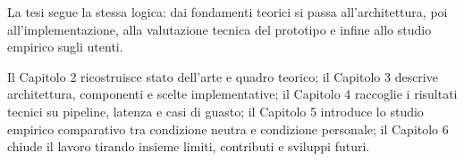 La tesi segue la stessa logica: dai fondamenti teorici si passa all'architettura, poi all'implementazione, alla valutazione tecnica del prototipo e infine allo studio empirico sugli utenti.

Il Capitolo 2 ricostruisce stato dell'arte e quadro teorico; il Capitolo 3 descrive architettura, componenti e scelte implementative; il Capitolo 4 raccoglie i risultati tecnici su pipeline, latenza e casi di guasto; il Capitolo 5 introduce lo studio empirico comparativo tra condizione neutra e condizione personale; il Capitolo 6 chiude il lavoro tirando insieme limiti, contributi e sviluppi futuri.
